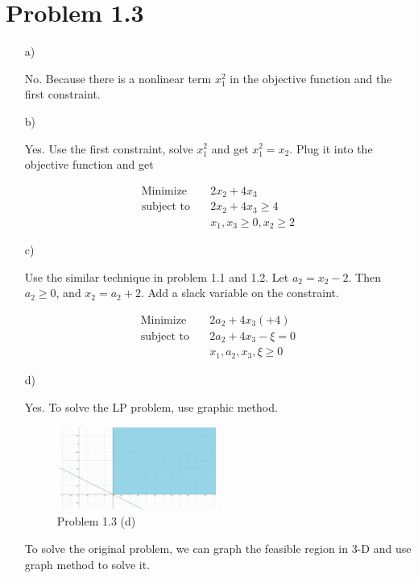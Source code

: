 \documentclass[12pt]{article}
\begin{document}
\section*{Problem 1.3}

\begin{enumerate}
\item[a)]

No. Because there is a nonlinear term $x_1^2$ in the objective function and the first constraint.

\item[b)]

Yes. Use the first constraint, solve $x_1^2$ and get $x_1^2 = x_2$. Plug it into the objective function and get 

\begin{equation*}
\begin{aligned}
\text{Minimize} \quad & 2x_2 + 4x_3 \\
\text{subject\  to} \quad & 2x_2 + 4x_3 \geqslant 4 \\
& x_1, x_3 \geqslant 0, x_2 \geqslant 2
\end{aligned}
\end{equation*}


\item[c)]

Use the similar technique in problem 1.1 and 1.2. Let $a_2 = x_2 - 2$. Then $a_2 \geqslant 0$, and $x_2 = a_2 + 2$. Add a slack variable on the constraint. 

\begin{equation*}
\begin{aligned}
\text{Minimize} \quad & 2a_2 + 4x_3 (+ 4) \\
\text{subject\  to} \quad & 2a_2 + 4x_3 - \xi = 0 \\
& x_1, a_2, x_3, \xi \geqslant 0
\end{aligned}
\end{equation*}

\item[d)]

Yes. To solve the LP problem, use graphic method. 

\FloatBarrier

\begin{figure}[htpb]
  \caption{Problem 1.3 (d)}
  \centering
    \includegraphics[width=0.5\textwidth]{fig2.pdf}
\end{figure}

\FloatBarrier








To solve the original problem, we can graph the feasible region in 3-D and use graph method to solve it.


\end{enumerate}
\end{document}
